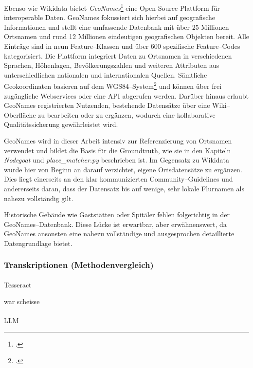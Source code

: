 \documentclass[12pt, a4paper, ngerman, bidi=default]{article}
\makeatletter
\let\cite\footcite
\let\oldparagraph\paragraph%
\renewcommand{\paragraph}{
    \@ifstar%
      \xxxParagraphStar%
      \xxxParagraphNoStar%
 }
\newcommand{\xxxParagraphStar}[1]{\oldparagraph*{#1}\mbox{}}
\newcommand{\xxxParagraphNoStar}[1]{\oldparagraph{#1}\mbox{}}
\makeatother
\begin{document}
Ebenso wie Wikidata bietet \textit{GeoNames}\cite[vgl.][]{noauthor_geonames_nodate} eine Open-Source-Plattform für interoperable Daten. GeoNames fokussiert sich hierbei auf geografische Informationen 
und stellt eine umfassende Datenbank mit über 25 Millionen Ortsnamen und rund 12 Millionen eindeutigen geografischen Objekten bereit.  
Alle Einträge sind in neun Feature–Klassen und über 600 spezifische Feature–Codes kategorisiert. Die Plattform integriert Daten zu 
Ortsnamen in verschiedenen Sprachen, Höhenlagen, Bevölkerungszahlen und weiteren Attributen aus unterschiedlichen nationalen und internationalen Quellen.  
Sämtliche Geokoordinaten basieren auf dem WGS84–System\cite[\textit{WGS84: geodätische Grundlage des Global Positioning System (GPS)};vgl.][]{noauthor_wgs84_nodate}
und können über frei zugängliche Webservices oder eine API abgerufen werden.  
Darüber hinaus erlaubt GeoNames registrierten Nutzenden, bestehende Datensätze über eine Wiki–Oberfläche zu bearbeiten oder zu ergänzen, wodurch eine 
kollaborative Qualitätssicherung gewährleistet wird.

GeoNames wird in dieser Arbeit intensiv zur Referenzierung von Ortsnamen verwendet und bildet die Basis für die Groundtruth, wie sie in den Kapiteln \textit{Nodegoat} und 
\textit{place\_matcher.py} beschrieben ist. Im Gegensatz zu Wikidata wurde hier von Beginn an darauf verzichtet, eigene Ortsdatensätze zu ergänzen. Dies liegt einerseits an 
den klar kommunizierten Community–Guidelines und andererseits daran, dass der Datensatz bis auf wenige, sehr lokale Flurnamen als nahezu vollständig gilt.

Historische Gebäude wie Gaststätten oder Spitäler fehlen folgerichtig in der GeoNames–Datenbank. Diese Lücke ist erwartbar, aber erwähnenswert, da GeoNames 
ansonsten eine nahezu vollständige und ausgesprochen detaillierte Datengrundlage bietet.

\subsubsection{Transkriptionen (Methodenvergleich)}\label{section:Transkriptionen_Methoden}
\paragraph{Tesseract}

war scheisse

\paragraph{LLM}
\end{document}
